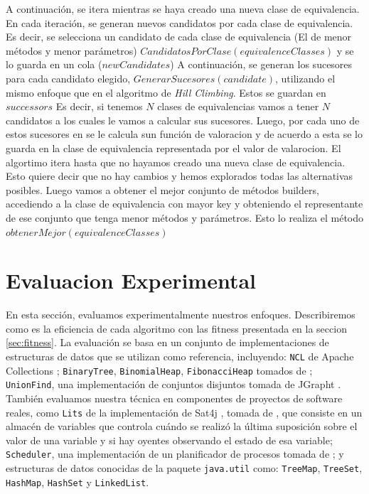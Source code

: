 A continuación, se itera mientras se haya creado una nueva clase de equivalencia. En cada iteración, se generan nuevos candidatos por cada clase de equivalencia. Es decir, se selecciona un candidato de cada clase de equivalencia (El de menor métodos y menor parámetros) $CandidatosPorClase(equivalenceClasses)$ y se lo guarda en un cola ($newCandidates$) A continuación, se generan los sucesores para cada candidato elegido, $GenerarSucesores(candidate)$, utilizando el mismo enfoque que en el algoritmo de \emph{Hill Climbing}. Estos se guardan en $successors$ Es decir, si tenemos $N$ clases de equivalencias vamos a tener $N$ candidatos a los cuales le vamos a calcular sus sucesores.  Luego, por cada uno de estos sucesores en  se le calcula sun función de valoracion y de acuerdo a esta se lo guarda en la clase de equivalencia representada por el valor de valarocion.
El algortimo itera hasta que no hayamos creado una nueva clase de equivalencia. Esto quiere decir que no hay cambios y hemos explorados todas las alternativas posibles. 
Luego vamos a obtener el mejor conjunto de métodos builders, accediendo a la clase de equivalencia con mayor key y obteniendo el representante de ese conjunto que tenga menor métodos y parámetros. Esto lo realiza el método $obtenerMejor(equivalenceClasses)$

\section{Evaluacion Experimental}
En esta sección, evaluamos experimentalmente nuestros enfoques. Describiremos como es la eficiencia de cada algoritmo con las fitness
presentada en la seccion \ref{sec:fitness}.
La evaluación se basa en un conjunto de implementaciones de estructuras de datos que se utilizan como referencia, incluyendo: \verb"NCL" de Apache Collections \cite{apache}; \verb"BinaryTree", \verb"BinomialHeap", \verb"FibonacciHeap" tomados de \cite{Visser:2006}; \verb"UnionFind", una implementación de conjuntos disjuntos tomada de JGrapht \cite{jgrapht}. También evaluamos nuestra técnica en componentes de proyectos de software reales, como \verb"Lits" de la implementación de Sat4j \cite{sat4j}, tomada de \cite{Loncaric:2018}, que consiste en un almacén de variables que controla cuándo se realizó la última suposición sobre el valor de una variable y si hay oyentes observando el estado de esa variable; \verb"Scheduler", una implementación de un planificador de procesos tomada de \cite{sir}; y estructuras de datos conocidas de la paquete \verb"java.util" como: \verb"TreeMap", \verb"TreeSet", \verb"HashMap", \verb"HashSet" y \verb"LinkedList". 

